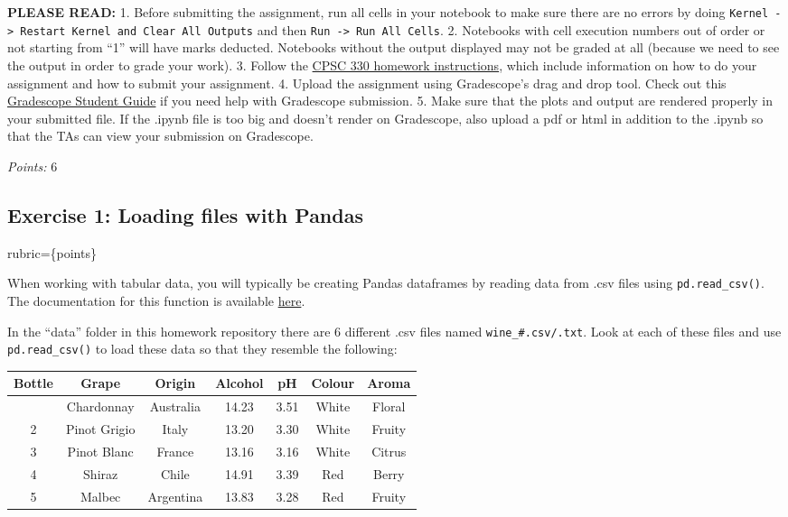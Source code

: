 \documentclass[11pt]{article}
\begin{document}
\textbf{PLEASE READ:} 1. Before submitting the assignment, run all cells
in your notebook to make sure there are no errors by doing
\texttt{Kernel\ -\textgreater{}\ Restart\ Kernel\ and\ Clear\ All\ Outputs}
and then \texttt{Run\ -\textgreater{}\ Run\ All\ Cells}. 2. Notebooks
with cell execution numbers out of order or not starting from ``1'' will
have marks deducted. Notebooks without the output displayed may not be
graded at all (because we need to see the output in order to grade your
work). 3. Follow the
\href{https://ubc-cs.github.io/cpsc330-2023W1/docs/homework_instructions.html}{CPSC
330 homework instructions}, which include information on how to do your
assignment and how to submit your assignment. 4. Upload the assignment
using Gradescope's drag and drop tool. Check out this
\href{https://lthub.ubc.ca/guides/gradescope-student-guide/}{Gradescope
Student Guide} if you need help with Gradescope submission. 5. Make sure
that the plots and output are rendered properly in your submitted file.
If the .ipynb file is too big and doesn't render on Gradescope, also
upload a pdf or html in addition to the .ipynb so that the TAs can view
your submission on Gradescope.

\emph{Points:} 6

    

    \subsection{Exercise 1: Loading files with
Pandas}\label{exercise-1-loading-files-with-pandas}

rubric=\{points\}

When working with tabular data, you will typically be creating Pandas
dataframes by reading data from .csv files using
\texttt{pd.read\_csv()}. The documentation for this function is
available
\href{https://pandas.pydata.org/pandas-docs/stable/reference/api/pandas.read_csv.html}{here}.

    In the ``data'' folder in this homework repository there are 6 different
.csv files named \texttt{wine\_\#.csv/.txt}. Look at each of these files
and use \texttt{pd.read\_csv()} to load these data so that they resemble
the following:

\begin{longtable}[]{@{}ccccccc@{}}
\toprule\noalign{}
Bottle & Grape & Origin & Alcohol & pH & Colour & Aroma \\
\midrule\noalign{}
\endhead
\bottomrule\noalign{}
\endlastfoot
1 & Chardonnay & Australia & 14.23 & 3.51 & White & Floral \\
2 & Pinot Grigio & Italy & 13.20 & 3.30 & White & Fruity \\
3 & Pinot Blanc & France & 13.16 & 3.16 & White & Citrus \\
4 & Shiraz & Chile & 14.91 & 3.39 & Red & Berry \\
5 & Malbec & Argentina & 13.83 & 3.28 & Red & Fruity \\
\end{longtable}
\end{document}
